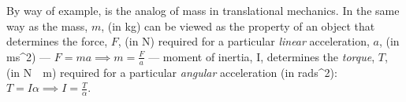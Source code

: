 By way of example,  is the analog of {mass} in
translational mechanics. In the same way as the mass, $m$, (in
\unit{kg}) can be viewed as the property of an object that determines
the force, $F$, (in \unit{N}) required for a particular \emph{linear}
acceleration, $a$, (in \unit{m}{s^2}) --- $F=ma \implies
m=\frac{F}{a}$ --- moment of inertia, I, determines the \emph{torque},
$T$, (in \unit{N\cdot m}) required for a particular \emph{angular}
acceleration (in \unit{rad}{s^2}): $T=I\alpha \implies
I=\frac{T}{\alpha}$.
